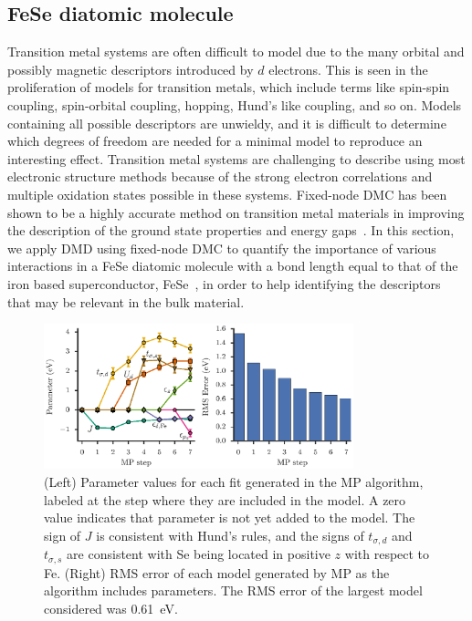 \subsection{FeSe diatomic molecule}
\label{subsection:fese}
Transition metal systems are often difficult to model due to the many orbital and possibly magnetic descriptors introduced by $d$ electrons. 
This is seen in the proliferation of models for transition metals, which include terms like spin-spin coupling, spin-orbital coupling, hopping, Hund's like coupling, and so on. 
Models containing all possible descriptors are unwieldy, and it is difficult to determine which degrees of freedom are needed for a minimal model to reproduce an interesting effect. 
Transition metal systems are challenging to describe using most electronic structure methods because of the strong electron correlations and multiple oxidation states possible in these systems. 
Fixed-node DMC has been shown to be a highly accurate method on transition metal materials in improving the description of the ground state properties and energy gaps~\cite{Foyevtsova2014, Wagner_Abbamonte, Zheng2015, Wagner2016}. In this section, we apply DMD using fixed-node DMC to quantify the importance of various interactions in a FeSe diatomic molecule with a bond length equal to that of the iron based superconductor, FeSe~\cite{kumar_crystal_2010}, in order to help identifying the descriptors that may be relevant in the bulk material.
\begin{figure}[htb]
  \centering
  \includegraphics[width=0.8\textwidth]{./Figures/fese.eps}
  \caption{
    \label{fig:fese} 
    (Left) Parameter values for each fit generated in the MP algorithm, labeled at the step where they are included in the model. 
    A zero value indicates that parameter is not yet added to the model.
    The sign of $J$ is consistent with Hund's rules, and the signs of $t_{\sigma,d}$ and $t_{\sigma,s}$ are consistent with Se being located in positive $z$ with respect to Fe. 
    (Right) RMS error of each model generated by MP as the algorithm includes parameters. 
    The RMS error of the largest model considered was 0.61~eV.
  }
\end{figure}

